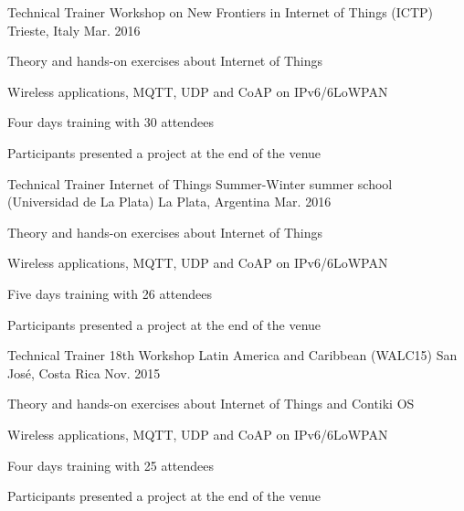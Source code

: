 \begin{cventries}
  \cventry
    {Technical Trainer} %
    {Workshop on New Frontiers in Internet of Things (ICTP)} %
    {Trieste, Italy} %
    {Mar. 2016} %
    {
      \begin{cvitems} %
        \item {Theory and hands-on exercises about Internet of Things}
        \item {Wireless applications, MQTT, UDP and CoAP on IPv6/6LoWPAN}
        \item {Four days training with 30 attendees}
        \item {Participants presented a project at the end of the venue }
      \end{cvitems}
    }

  \cventry
    {Technical Trainer} %
    {Internet of Things Summer-Winter summer school (Universidad de La Plata)} %
    {La Plata, Argentina} %
    {Mar. 2016} %
    {
      \begin{cvitems} %
        \item {Theory and hands-on exercises about Internet of Things}
        \item {Wireless applications, MQTT, UDP and CoAP on IPv6/6LoWPAN}
        \item {Five days training with 26 attendees}
        \item {Participants presented a project at the end of the venue }
      \end{cvitems}
    }

  \cventry
    {Technical Trainer} %
    {18th Workshop Latin America and Caribbean (WALC15)} %
    {San José, Costa Rica} %
    {Nov. 2015} %
    {
      \begin{cvitems} %
        \item {Theory and hands-on exercises about Internet of Things and Contiki OS}
        \item {Wireless applications, MQTT, UDP and CoAP on IPv6/6LoWPAN}
        \item {Four days training with 25 attendees}
        \item {Participants presented a project at the end of the venue }
      \end{cvitems}
    }


\end{cventries}
